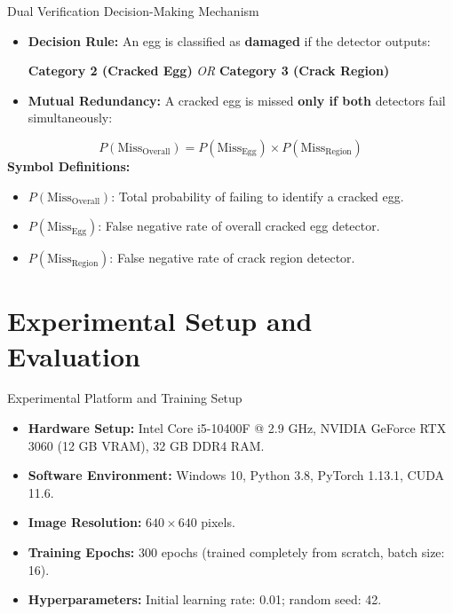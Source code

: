 \documentclass{beamer}
\begin{document}
\begin{frame}{Dual Verification Decision-Making Mechanism}
\begin{itemize}
    \item \textbf{Decision Rule:} An egg is classified as \textbf{damaged} if the detector outputs:
    \begin{center}
        \textbf{Category 2 (Cracked Egg)} \quad \textit{OR} \quad \textbf{Category 3 (Crack Region)}
    \end{center}
    \item \textbf{Mutual Redundancy:} A cracked egg is missed \textbf{only if both} detectors fail simultaneously:
\end{itemize}
\vspace{-0.15cm}
\begin{equation*}
P(\text{Miss}_{\text{Overall}}) = P(\text{Miss}_{\text{Egg}}) \times P(\text{Miss}_{\text{Region}})
\end{equation*}
\vspace{-0.25cm}
\textbf{Symbol Definitions:}
\vspace{0.12cm}
\begin{itemize}
    \item $P(\text{Miss}_{\text{Overall}})$: Total probability of failing to identify a cracked egg.
    \item $P(\text{Miss}_{\text{Egg}})$: False negative rate of overall cracked egg detector.
    \item $P(\text{Miss}_{\text{Region}})$: False negative rate of crack region detector.
\end{itemize}
\end{frame}

\section{Experimental Setup and Evaluation}

\begin{frame}{Experimental Platform and Training Setup}
\small
\begin{itemize}
    \item \textbf{Hardware Setup:} Intel Core i5-10400F @ 2.9 GHz, NVIDIA GeForce RTX 3060 (12 GB VRAM), 32 GB DDR4 RAM.
    \medskip
    \item \textbf{Software Environment:} Windows 10, Python 3.8, PyTorch 1.13.1, CUDA 11.6.
    \medskip
    \item \textbf{Image Resolution:} $640 \times 640$ pixels.
    \medskip
    \item \textbf{Training Epochs:} 300 epochs (trained completely from scratch, batch size: 16).
    \medskip
    \item \textbf{Hyperparameters:} Initial learning rate: 0.01; random seed: 42.
\end{itemize}
\end{frame}
\end{document}
